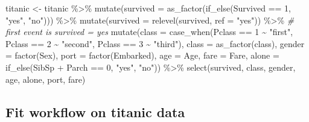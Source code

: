 \documentclass[
]{book}
\newenvironment{Shaded}{\begin{snugshade}}{\end{snugshade}}
\newcommand{\AttributeTok}[1]{\textcolor[rgb]{0.77,0.63,0.00}{#1}}
\newcommand{\CommentTok}[1]{\textcolor[rgb]{0.56,0.35,0.01}{\textit{#1}}}
\newcommand{\DecValTok}[1]{\textcolor[rgb]{0.00,0.00,0.81}{#1}}
\newcommand{\FunctionTok}[1]{\textcolor[rgb]{0.00,0.00,0.00}{#1}}
\newcommand{\NormalTok}[1]{#1}
\newcommand{\OtherTok}[1]{\textcolor[rgb]{0.56,0.35,0.01}{#1}}
\newcommand{\SpecialCharTok}[1]{\textcolor[rgb]{0.00,0.00,0.00}{#1}}
\newcommand{\StringTok}[1]{\textcolor[rgb]{0.31,0.60,0.02}{#1}}
\begin{document}
\begin{Shaded}
\begin{Highlighting}[]
\NormalTok{titanic }\OtherTok{\textless{}{-}}\NormalTok{ titanic }\SpecialCharTok{\%\textgreater{}\%} \FunctionTok{mutate}\NormalTok{(}\AttributeTok{survived =} \FunctionTok{as\_factor}\NormalTok{(}\FunctionTok{if\_else}\NormalTok{(Survived }\SpecialCharTok{==} \DecValTok{1}\NormalTok{, }\StringTok{"yes"}\NormalTok{, }\StringTok{"no"}\NormalTok{))) }\SpecialCharTok{\%\textgreater{}\%}   
            \FunctionTok{mutate}\NormalTok{(}\AttributeTok{survived =} \FunctionTok{relevel}\NormalTok{(survived, }\AttributeTok{ref =} \StringTok{"yes"}\NormalTok{)) }\SpecialCharTok{\%\textgreater{}\%} \CommentTok{\# first event is survived = yes}
             \FunctionTok{mutate}\NormalTok{(}\AttributeTok{class =} \FunctionTok{case\_when}\NormalTok{(Pclass }\SpecialCharTok{==} \DecValTok{1} \SpecialCharTok{\textasciitilde{}} \StringTok{"first"}\NormalTok{,}
\NormalTok{                             Pclass }\SpecialCharTok{==} \DecValTok{2} \SpecialCharTok{\textasciitilde{}} \StringTok{"second"}\NormalTok{,}
\NormalTok{                             Pclass }\SpecialCharTok{==} \DecValTok{3} \SpecialCharTok{\textasciitilde{}} \StringTok{"third"}\NormalTok{),}
                              \AttributeTok{class =} \FunctionTok{as\_factor}\NormalTok{(class),}
                              \AttributeTok{gender =} \FunctionTok{factor}\NormalTok{(Sex),}
                              \AttributeTok{port =} \FunctionTok{factor}\NormalTok{(Embarked),}
                              \AttributeTok{age =}\NormalTok{ Age,}
                              \AttributeTok{fare =}\NormalTok{ Fare,}
                              \AttributeTok{alone =} \FunctionTok{if\_else}\NormalTok{(SibSp }\SpecialCharTok{+}\NormalTok{ Parch }\SpecialCharTok{==} \DecValTok{0}\NormalTok{, }\StringTok{"yes"}\NormalTok{, }\StringTok{"no"}\NormalTok{)) }\SpecialCharTok{\%\textgreater{}\%}
 \FunctionTok{select}\NormalTok{(survived, class, gender, age, alone, port, fare) }
\end{Highlighting}
\end{Shaded}

\hypertarget{fit-workflow-on-titanic-data}{%
\subsection{Fit workflow on titanic data}\label{fit-workflow-on-titanic-data}}
\end{document}
